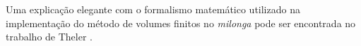 


Uma explicação elegante com o formalismo
matemático utilizado na implementação do método de volumes finitos no
\textit{milonga} pode ser encontrada no trabalho de Theler \cite[Seção 3.5.2]{Theler2016}.







